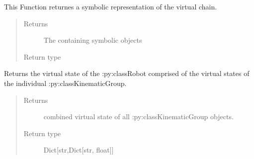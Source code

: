 \documentclass[letterpaper,10pt,english]{sphinxmanual}
\begin{document}
\begin{fulllineitems}
\begin{fulllineitems}
\label{\detokenize{code_docu:trip_kinematics.Robot.Robot.get_symbolic_rep}}
This Function returnes a symbolic representation of the virtual chain.
\begin{quote}\begin{description}
\item[{Returns}] \leavevmode
The  containing symbolic objects

\item[{Return type}] \leavevmode
{\hyperref[\detokenize{code_docu:trip_kinematics.HomogenTransformationMatrix.TransformationMatrix}]{}}

\end{description}\end{quote}

\end{fulllineitems}


\begin{fulllineitems}
\label{\detokenize{code_docu:trip_kinematics.Robot.Robot.get_virtual_state}}
Returns the virtual state of the :py:class\textasciigrave{}Robot\textasciigrave{} comprised of the virtual states of the individual :py:class\textasciigrave{}KinematicGroup\textasciigrave{}.
\begin{quote}\begin{description}
\item[{Returns}] \leavevmode
combined virtual state of all :py:class\textasciigrave{}KinematicGroup\textasciigrave{} objects.

\item[{Return type}] \leavevmode
Dict{[}str,Dict{[}str, float{]}{]}

\end{description}\end{quote}

\end{fulllineitems}



\end{fulllineitems}
\end{document}
